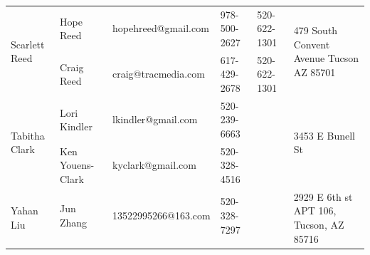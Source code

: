 \documentclass[landscape]{article}\usepackage[]{graphicx}\usepackage[]{color}
\begin{document}
\begin{longtable}{|p{100pt}|p{100pt}|p{140pt}|p{60pt}|p{64pt}|p{120pt}|}
\hline
\multirow{2}{100pt}{Scarlett Reed} & Hope Reed & hopehreed@gmail.com & 978-500-2627 & 520-622-1301 & \multirow{2}{120pt}{479 South Convent Avenue Tucson AZ  85701} \\
 & Craig Reed & craig@tracmedia.com & 617-429-2678 & 520-622-1301 & \\
\hline
\multirow{2}{100pt}{Tabitha Clark} & Lori Kindler & lkindler@gmail.com & 520-239-6663 &  & \multirow{2}{120pt}{3453 E Bunell St} \\
 & Ken Youens-Clark & kyclark@gmail.com & 520-328-4516 &  & \\
\hline
\multirow{2}{100pt}{Yahan Liu} & Jun Zhang & 13522995266@163.com & 520-328-7297 &  & \multirow{2}{120pt}{2929 E 6th st APT 106, Tucson, AZ 85716} \\
 &  &  &  &  & \\
\hline
\end{longtable}
\newpage
\end{document}
